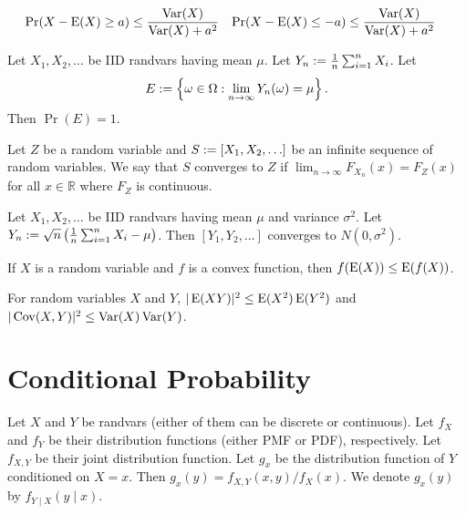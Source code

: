 \documentclass[a4paper, 12pt, fleqn]{article}
\DeclareMathOperator{\Cov}{Cov}
\begin{document}
\begin{theorem}
\begin{align*}
\Pr(X-\operatorname*{E}(X) \ge a) &\le \frac{\operatorname*{Var}(X)}{\operatorname*{Var}(X)+a^2}
& \Pr(X-\operatorname*{E}(X) \le -a) &\le \frac{\operatorname*{Var}(X)}{\operatorname*{Var}(X)+a^2}
\end{align*}
\end{theorem}

\begin{theorem}
Let $X_1, X_2, \ldots$ be IID randvars having mean $\mu$.
Let $Y_n := \frac{1}{n} \sum_{i=1}^n X_i$. Let
\[ E := \left\{\omega \in \Omega: \lim_{n \to \infty} Y_n(\omega) = \mu\right\}. \]
Then $\Pr(E) = 1$.
\end{theorem}

\begin{definition}
Let $Z$ be a random variable and $S := [X_1, X_2, \ldots]$ be an infinite sequence
of random variables. We say that $S$ converges to $Z$ if
$\lim_{n \to \infty} F_{X_n}(x) = F_Z(x)$ for all $x \in \mathbb{R}$ where $F_Z$ is continuous.
\end{definition}

\begin{theorem}
Let $X_1, X_2, \ldots$ be IID randvars having mean $\mu$ and variance $\sigma^2$.
Let $Y_n := \sqrt{n}\left(\frac{1}{n}\sum_{i=1}^n X_i - \mu\right)$.
Then $[Y_1, Y_2, \ldots]$ converges to $N(0, \sigma^2)$.
\end{theorem}

\begin{theorem}
If $X$ is a random variable and $f$ is a convex function, then $f(\operatorname*{E}(X)) \le \operatorname*{E}(f(X))$.
\end{theorem}

\begin{theorem}
For random variables $X$ and $Y$, $|\operatorname*{E}(XY)|^2 \le \operatorname*{E}(X^2)\operatorname*{E}(Y^2)$
and $|\Cov(X,Y)|^2 \le \Var(X)\Var(Y)$.
\end{theorem}

\section{Conditional Probability}

\begin{theorem}
Let $X$ and $Y$ be randvars (either of them can be discrete or continuous).
Let $f_X$ and $f_Y$ be their distribution functions (either PMF or PDF), respectively.
Let $f_{X,Y}$ be their joint distribution function.
Let $g_x$ be the distribution function of $Y$ conditioned on $X=x$.
Then $g_x(y) = f_{X,Y}(x, y) / f_X(x)$.
We denote $g_x(y)$ by $f_{Y \mid X}(y \mid x)$.
\end{theorem}
\end{document}
